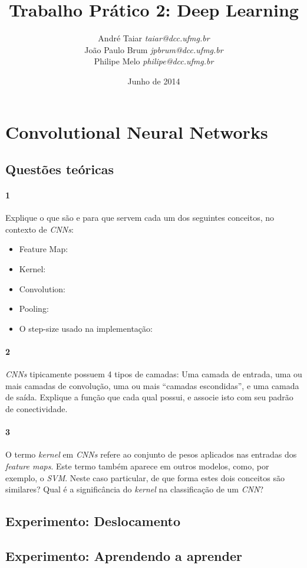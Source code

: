 \documentclass[12pt, a4paper]{article}
\title{Trabalho Prático 2: Deep Learning}
\date{Junho de 2014}
\author{
    André Taiar      \emph{taiar@dcc.ufmg.br}   \\
    João Paulo Brum  \emph{jpbrum@dcc.ufmg.br}  \\
    Philipe Melo     \emph{philipe@dcc.ufmg.br}
  }
\begin{document}
\maketitle

\section{Convolutional Neural Networks}
\subsection{Questões teóricas}
\paragraph{1} Explique o que são e para que servem cada um dos seguintes conceitos, no contexto de
  \emph{CNNs}:
\begin{itemize}
  \item Feature Map:
  \item Kernel:
  \item Convolution:
  \item Pooling:
  \item O step-size usado na implementação:
\end{itemize}

\paragraph{2} \emph{CNNs} tipicamente possuem 4 tipos de camadas: Uma camada de entrada, uma ou mais
  camadas de convolução, uma ou mais ``camadas escondidas'', e uma camada de saída. Explique a
  função que cada qual possui, e associe isto com seu padrão de conectividade.

\paragraph{3} O termo \emph{kernel} em \emph{CNNs} refere ao conjunto de pesos aplicados nas
  entradas dos \emph{feature maps}. Este termo também aparece em outros modelos, como, por exemplo,
  o \emph{SVM}. Neste caso particular, de que forma estes dois conceitos são similares? Qual é a
  significância do \emph{kernel} na classificação de um \emph{CNN}?

\subsection{Experimento: Deslocamento }
\subsection{Experimento: Aprendendo a aprender}
\end{document}
